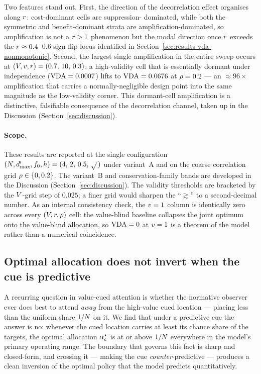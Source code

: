 %
Two features stand out. First, the direction of the decorrelation
effect organises along $r$: cost-dominant cells are suppression-%
dominated, while both the symmetric and benefit-dominant strata are
amplification-dominated, so amplification is not a $r > 1$
phenomenon but the modal direction once $r$ exceeds the
$r \approx 0.4$--$0.6$ sign-flip locus identified in
Section~\ref{sec:results-vda-nonmonotonic}. Second, the largest single
amplification in the entire sweep occurs at $(V, v, r) =
(0.7,\, 10,\, 0.3)$: a high-validity cell that is essentially dormant
under independence ($\mathrm{VDA} = 0.0007$) lifts to $\mathrm{VDA} = 0.0676$ at $\rho
= 0.2$ --- an $\approx 96\times$ amplification that carries a
normally-negligible design point into the same magnitude as the
low-validity corner. This dormant-cell amplification is a distinctive,
falsifiable consequence of the decorrelation channel, taken up in the
Discussion (Section~\ref{sec:discussion}).

\paragraph{Scope.}
These results are reported at the single configuration $(N,
d'_{\max}, f_0, h) = (4,\,2,\,0.5,\,\sqrt{}\,)$ under variant~A and on
the coarse correlation grid $\rho \in \{0, 0.2\}$. The variant~B and
conservation-family bands are developed in the Discussion
(Section~\ref{sec:discussion}). The validity thresholds are bracketed by
the $V$-grid step of $0.025$; a finer grid would sharpen the
``$\gtrsim$'' to a second-decimal number. As an internal consistency
check, the $v = 1$ column is identically zero across every $(V,
r, \rho)$ cell: the value-blind baseline collapses the joint
optimum onto the value-blind allocation, so $\mathrm{VDA} = 0$ at $v = 1$ is
a theorem of the model rather than a numerical coincidence.

\subsection{Optimal allocation does not invert when the cue is
            predictive}
\label{sec:results-noninversion}

A recurring question in value-cued attention is whether the normative
observer ever does best to attend \emph{away} from the high-value cued
location --- placing less than the uniform share $1/N$ on it. We
find that under a predictive cue the answer is no: whenever the cued
location carries at least its chance share of the targets, the optimal
allocation $\alpha_c^\star$ is at or above $1/N$ everywhere in the
model's primary operating range. The boundary that governs this fact is
sharp and closed-form, and crossing it --- making the cue
\emph{counter}-predictive --- produces a clean inversion of the optimal
policy that the model predicts quantitatively.

